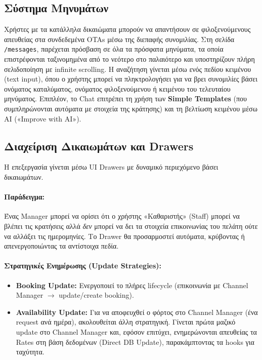 \documentclass[
	12pt, %
	oneside, %
	greek,
	onehalfspacing, %
	liststotoc, %
	toctotoc, %
	parskip, %
	headsepline, %
]{MastersDoctoralThesis} %
\newcommand{\code}[1]{\texttt{#1}}
\begin{document}
\subsection{Σύστημα Μηνυμάτων}
\label{subsec:messages}

Χρήστες με τα κατάλληλα δικαιώματα μπορούν να απαντήσουν σε φιλοξενούμενους απευθείας στα συνδεδεμένα OTAs μέσω της διεπαφής συνομιλίας. Στη σελίδα \code{/messages}, παρέχεται πρόσβαση σε όλα τα πρόσφατα μηνύματα, τα οποία επιστρέφονται ταξινομημένα από το νεότερο στο παλαιότερο και υποστηρίζουν πλήρη σελιδοποίηση με infinite scrolling. Η αναζήτηση γίνεται μέσω ενός πεδίου κειμένου (text input), όπου ο χρήστης μπορεί να πληκτρολογήσει για να βρει συνομιλίες βάσει ονόματος καταλύματος, ονόματος φιλοξενούμενου ή κειμένου του τελευταίου μηνύματος. Επιπλέον, το Chat επιτρέπει τη χρήση των \textbf{Simple Templates} (που συμπληρώνονται αυτόματα με στοιχεία της κράτησης) και τη βελτίωση κειμένου μέσω AI («Improve with AI»).

\subsection{Διαχείριση Δικαιωμάτων και Drawers}
\label{subsec:access-management}

Η επεξεργασία γίνεται μέσω UI Drawers με δυναμικό περιεχόμενο βάσει δικαιωμάτων.

\paragraph{Παράδειγμα:}
Ένας Manager μπορεί να ορίσει ότι ο χρήστης «Καθαριστής» (Staff) μπορεί να βλέπει τις κρατήσεις αλλά \textit{δεν} μπορεί να δει τα στοιχεία επικοινωνίας του πελάτη ούτε να αλλάξει τις ημερομηνίες. Το Drawer θα προσαρμοστεί αυτόματα, κρύβοντας ή απενεργοποιώντας τα αντίστοιχα πεδία.

\paragraph{Στρατηγικές Ενημέρωσης (Update Strategies):}
\begin{itemize}
    \item \textbf{Booking Update:} Ενεργοποιεί το πλήρες lifecycle (επικοινωνία με Channel Manager $\rightarrow$ update/create booking).
    \item \textbf{Availability Update:} Για να αποφευχθεί ο φόρτος στο Channel Manager (ένα request ανά ημέρα), ακολουθείται άλλη στρατηγική. Γίνεται πρώτα μαζικό update στο Channel Manager και, εφόσον επιτύχει, ενημερώνονται απευθείας τα Rates στη βάση δεδομένων (Direct DB Update), παρακάμπτοντας τα hooks για ταχύτητα.
\end{itemize}
\end{document}
